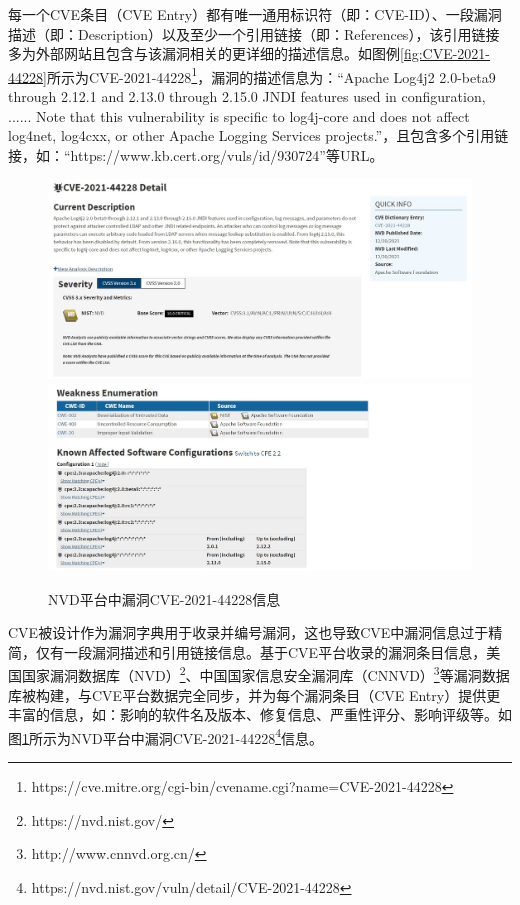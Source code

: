 每一个CVE条目（CVE Entry）都有唯一通用标识符（即：CVE-ID）、一段漏洞描述（即：Description）以及至少一个引用链接（即：References），该引用链接多为外部网站且包含与该漏洞相关的更详细的描述信息。如图例\ref{fig:CVE-2021-44228}所示为CVE-2021-44228\footnote{https://cve.mitre.org/cgi-bin/cvename.cgi?name=CVE-2021-44228}，漏洞的描述信息为：“Apache Log4j2 2.0-beta9 through 2.12.1 and 2.13.0 through 2.15.0 JNDI features used in configuration, ...... Note that this vulnerability is specific to log4j-core and does not affect log4net, log4cxx, or other Apache Logging Services projects.”，且包含多个引用链接，如：“https://www.kb.cert.org/vuls/id/930724”等URL。

\begin{figure}[h]
    \centering
    \includegraphics[width=1.0\textwidth]{res/NVD-2021-44228}
    \includegraphics[width=1.0\textwidth]{res/NVD-2021-44228-2}
    \caption{NVD平台中漏洞CVE-2021-44228信息}
    \label{fig:NVD-2021-44228}
\end{figure}

CVE被设计作为漏洞字典用于收录并编号漏洞，这也导致CVE中漏洞信息过于精简，仅有一段漏洞描述和引用链接信息。基于CVE平台收录的漏洞条目信息，美国国家漏洞数据库（NVD）\footnote{https://nvd.nist.gov/}、中国国家信息安全漏洞库（CNNVD）\footnote{http://www.cnnvd.org.cn/}等漏洞数据库被构建，与CVE平台数据完全同步，并为每个漏洞条目（CVE Entry）提供更丰富的信息，如：影响的软件名及版本、修复信息、严重性评分、影响评级等。如图\ref{fig:NVD-2021-44228}所示为NVD平台中漏洞CVE-2021-44228\footnote{https://nvd.nist.gov/vuln/detail/CVE-2021-44228}信息。



